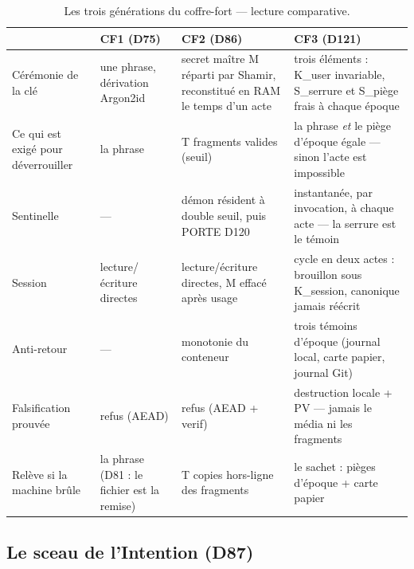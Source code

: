 \begin{table}[htbp]
\centering\small
\caption{Les trois générations du coffre-fort — lecture comparative.}
\label{tab:comparatif}
\begin{tabularx}{\textwidth}{@{}l Y Y Y@{}}
\toprule
 & \textbf{CF1 (D75)} & \textbf{CF2 (D86)} & \textbf{CF3 (D121)} \\
\midrule
Cérémonie de la clé & une phrase, dérivation Argon2id & secret maître M réparti par
Shamir, reconstitué en RAM le temps d'un acte & trois éléments : K\_user invariable,
S\_serrure et S\_piège frais à chaque époque \\
Ce qui est exigé pour déverrouiller & la phrase & T fragments valides (seuil) & la
phrase \emph{et} le piège d'époque égale — sinon l'acte est impossible \\
Sentinelle & — & démon résident à double seuil, puis PORTE D120 & instantanée, par
invocation, à chaque acte — la serrure est le témoin \\
Session & lecture/écriture directes & lecture/écriture directes, M effacé après usage &
cycle en deux actes : brouillon sous K\_session, canonique jamais réécrit \\
Anti-retour & — & monotonie du conteneur & trois témoins d'époque (journal local,
carte papier, journal Git) \\
Falsification prouvée & refus (AEAD) & refus (AEAD + verif) & destruction locale + PV —
jamais le média ni les fragments \\
Relève si la machine brûle & la phrase (D81 : le fichier est la remise) & T copies
hors-ligne des fragments & le sachet : pièges d'époque + carte papier \\
\bottomrule
\end{tabularx}
\end{table}

\subsection{Le sceau de l'Intention (D87)}\label{sec:sceauI}


